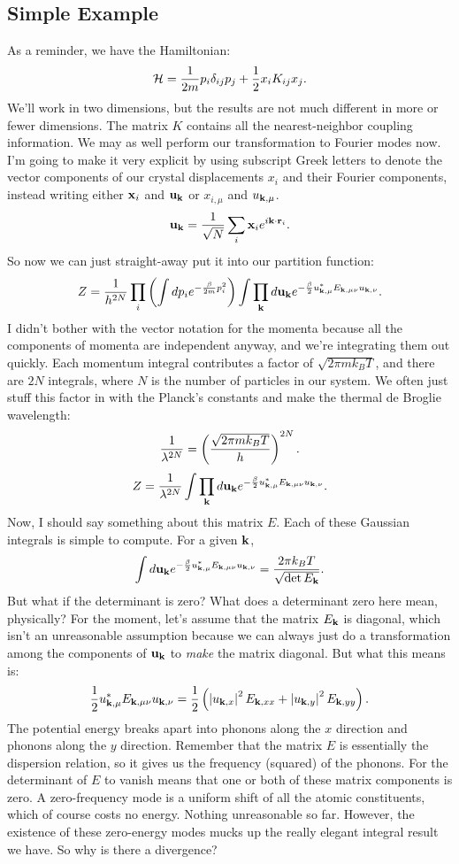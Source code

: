 \documentclass[12pt]{article}
\begin{document}
\subsection{Simple Example}
As a reminder, we have the Hamiltonian:
\[ \mathcal{H} = \frac{1}{2m}p_i\delta_{ij}p_j + \frac{1}{2} x_i K_{ij} x_j.\]
We'll work in two dimensions, but the results are not much different in more or fewer dimensions. The matrix $K$ contains all the nearest-neighbor coupling information. We may as well perform our transformation to Fourier modes now. I'm going to make it very explicit by using subscript Greek letters to denote the vector components of our crystal displacements $x_i$ and their Fourier components, instead writing either $\mathbf{x} _i$ and $\mathbf{u}_{\mathbf{k}}$ or $x_{i,\mu}$ and $u_{\mathbf{k}, \mu}$.
\[ \mathbf{u}_{\mathbf{k}} = \frac{1}{\sqrt{N}} \sum_i \mathbf{x}_i e^{i \mathbf{k}\cdot\mathbf{r}_i}.\]
So now we can just straight-away put it into our partition function:
\[ Z = \frac{1}{h^{2N}}\prod_i\left(\int dp_i e^{-\frac{\beta}{2m} p_i^2} \right)\int \prod_{\mathbf{k}} d\mathbf{u}_{\mathbf{k}} e^{-\frac{\beta}{2} u^*_{\mathbf{k},\mu} E_{\mathbf{k}, \mu\nu} u_{\mathbf{k},\nu}}.\]
I didn't bother with the vector notation for the momenta because all the components of momenta are independent anyway, and we're integrating them out quickly. Each momentum integral contributes a factor of $\sqrt{2\pi m k_BT}$, and there are $2N$ integrals, where $N$ is the number of particles in our system. We often just stuff this factor in with the Planck's constants and make the thermal de Broglie wavelength:
\[ \frac{1}{\lambda^{2N}} = \left(\frac{\sqrt{2\pi m k_BT}}{h}\right)^{2N}.\]
\[ Z = \frac{1}{\lambda^{2N}} \int \prod_{\mathbf{k}} d\mathbf{u}_{\mathbf{k}} e^{-\frac{\beta}{2} u^*_{\mathbf{k},\mu} E_{\mathbf{k}, \mu\nu} u_{\mathbf{k},\nu}}.\]
Now, I should say something about this matrix $E$. Each of these Gaussian integrals is simple to compute. For a given $\mathbf{k}$,
\[ \int d\mathbf{u}_{\mathbf{k}} e^{-\frac{\beta}{2} u^*_{\mathbf{k},\mu} E_{\mathbf{k}, \mu\nu} u_{\mathbf{k},\nu}} = \frac{2\pi k_BT}{\sqrt{\det E_{\mathbf{k}}}}.\]
But what if the determinant is zero? What does a determinant zero here mean, physically? For the moment, let's assume that the matrix $E_{\mathbf{k}}$ is diagonal, which isn't an unreasonable assumption because we can always just do a transformation among the components of $\mathbf{u}_{\mathbf{k}}$ to \emph{make} the matrix diagonal. But what this means is:
\[ \frac{1}{2}u^*_{\mathbf{k}, \mu} E_{\mathbf{k}, \mu\nu} u_{\mathbf{k},\nu} = \frac{1}{2}\left( \left | u_{\mathbf{k},x} \right |^2 E_{\mathbf{k}, xx} + \left | u_{\mathbf{k},y} \right |^2 E_{\mathbf{k}, yy} \right).\]
The potential energy breaks apart into phonons along the $x$ direction and phonons along the $y$ direction. Remember that the matrix $E$ is essentially the dispersion relation, so it gives us the frequency (squared) of the phonons. For the determinant of $E$ to vanish means that one or both of these matrix components is zero. A zero-frequency mode is a uniform shift of all the atomic constituents, which of course costs no energy. Nothing unreasonable so far. However, the existence of these zero-energy modes mucks up the really elegant integral result we have. So why is there a divergence?
\end{document}
